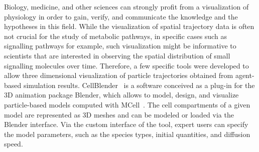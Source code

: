 Biology, medicine, and other sciences can strongly profit from a visualization of physiology in order to gain, verify, and communicate the knowledge and the hypotheses in this field.
While the visualization of spatial trajectory data is often not crucial for the study of metabolic pathways, in specific cases such as signalling pathways for example, such visualization might be informative to scientists that are interested in observing the spatial distribution of small signalling molecules over time.
Therefore, a few specific tools were developed to allow three dimensional visualization of particle trajectories obtained from agent-based simulation results.
CellBlender~\cite{cellblender} is a software conceived as a plug-in for the 3D animation package Blender, which allows to model, design, and visualize particle-based models computed with MCell~\cite{kerr2008fast}.
The cell compartments of a given model are represented as 3D meshes and can be modeled or loaded via the Blender interface.
Via the custom interface of the tool, expert users can specify the model parameters, such as the species types, initial quantities, and diffusion speed.

